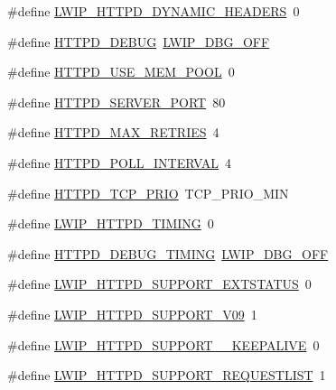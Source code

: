 \begin{DoxyCompactItemize}
\#define \hyperlink{group__httpd__opts_ga75932fc5eeb9abeddfdaf8413574c6d7}{L\+W\+I\+P\+\_\+\+H\+T\+T\+P\+D\+\_\+\+D\+Y\+N\+A\+M\+I\+C\+\_\+\+H\+E\+A\+D\+E\+RS}~0
\item 
\#define \hyperlink{group__httpd__opts_ga33cd73e701130f8fc3dc7db0a3013aa1}{H\+T\+T\+P\+D\+\_\+\+D\+E\+B\+UG}~\hyperlink{group__debugging__levels_gadab1cdc3f45939a3a5c9a3d7e04987e1}{L\+W\+I\+P\+\_\+\+D\+B\+G\+\_\+\+O\+FF}
\item 
\#define \hyperlink{group__httpd__opts_gabb13219495a813fceaafa954a238a924}{H\+T\+T\+P\+D\+\_\+\+U\+S\+E\+\_\+\+M\+E\+M\+\_\+\+P\+O\+OL}~0
\item 
\#define \hyperlink{group__httpd__opts_ga2b058c5d1bd67e5d7cb260166e3ace50}{H\+T\+T\+P\+D\+\_\+\+S\+E\+R\+V\+E\+R\+\_\+\+P\+O\+RT}~80
\item 
\#define \hyperlink{group__httpd__opts_gad92e78e19fd3ab2af42750e83ed73fd5}{H\+T\+T\+P\+D\+\_\+\+M\+A\+X\+\_\+\+R\+E\+T\+R\+I\+ES}~4
\item 
\#define \hyperlink{group__httpd__opts_gacc3e7667baa2cfafd23de2b152df7a63}{H\+T\+T\+P\+D\+\_\+\+P\+O\+L\+L\+\_\+\+I\+N\+T\+E\+R\+V\+AL}~4
\item 
\#define \hyperlink{group__httpd__opts_gaabd1f6319d04b8d5f2c93270794d5182}{H\+T\+T\+P\+D\+\_\+\+T\+C\+P\+\_\+\+P\+R\+IO}~T\+C\+P\+\_\+\+P\+R\+I\+O\+\_\+\+M\+IN
\item 
\#define \hyperlink{group__httpd__opts_ga054db3f080715942967969c6ae30bb6a}{L\+W\+I\+P\+\_\+\+H\+T\+T\+P\+D\+\_\+\+T\+I\+M\+I\+NG}~0
\item 
\#define \hyperlink{group__httpd__opts_ga5f2642874f930798d975b1f7a6d2e1da}{H\+T\+T\+P\+D\+\_\+\+D\+E\+B\+U\+G\+\_\+\+T\+I\+M\+I\+NG}~\hyperlink{group__debugging__levels_gadab1cdc3f45939a3a5c9a3d7e04987e1}{L\+W\+I\+P\+\_\+\+D\+B\+G\+\_\+\+O\+FF}
\item 
\#define \hyperlink{group__httpd__opts_ga85ebddbc4236b1e31bfa68fa163f9b07}{L\+W\+I\+P\+\_\+\+H\+T\+T\+P\+D\+\_\+\+S\+U\+P\+P\+O\+R\+T\+\_\+\+E\+X\+T\+S\+T\+A\+T\+US}~0
\item 
\#define \hyperlink{group__httpd__opts_ga7a8f4ab787b6fb8482c8a36c9fd0c7dd}{L\+W\+I\+P\+\_\+\+H\+T\+T\+P\+D\+\_\+\+S\+U\+P\+P\+O\+R\+T\+\_\+\+V09}~1
\item 
\#define \hyperlink{group__httpd__opts_ga6f78487bc829f7f98274f1264020045e}{L\+W\+I\+P\+\_\+\+H\+T\+T\+P\+D\+\_\+\+S\+U\+P\+P\+O\+R\+T\+\_\+\_\+\+K\+E\+E\+P\+A\+L\+I\+VE}~0
\item 
\#define \hyperlink{group__httpd__opts_ga0bd0f9a89423fb3bbfea4e4c6141ae43}{L\+W\+I\+P\+\_\+\+H\+T\+T\+P\+D\+\_\+\+S\+U\+P\+P\+O\+R\+T\+\_\+\+R\+E\+Q\+U\+E\+S\+T\+L\+I\+ST}~1

\end{DoxyCompactItemize}

